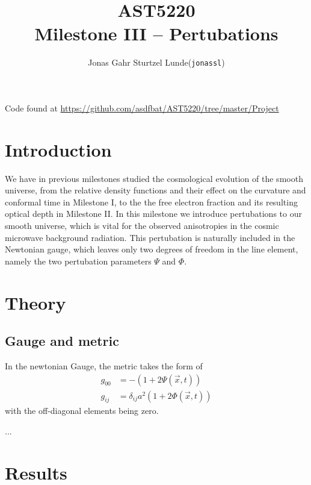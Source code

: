 \documentclass[10pt, a4paper]{article}
\begin{document}
\title{AST5220\\ Milestone III -- Pertubations}
\author{
    \begin{tabular}{r l}
        Jonas Gahr Sturtzel Lunde & (\texttt{jonassl})
    \end{tabular}}

\maketitle
Code found at \url{https://github.com/asdfbat/AST5220/tree/master/Project}
\vspace{0.7cm}

\section{Introduction}
We have in previous milestones studied the cosmological evolution of the smooth universe, from the relative density functions and their effect on the curvature and conformal time in Milestone I, to the the free electron fraction and its resulting optical depth in Milestone II. In this milestone we introduce pertubations to our smooth universe, which is vital for the observed anisotropies in the cosmic microwave background radiation. This pertubation is naturally included in the Newtonian gauge, which leaves only two degrees of freedom in the line element, namely the two pertubation parameters $\Psi$ and $\Phi$.


\section{Theory}
\subsection{Gauge and metric}
In the newtonian Gauge, the metric takes the form of
\begin{equation}
    \begin{aligned}
        g_{00} &= - (1 + 2\Psi(\vec x,t)) \\ 
        g_{ij} &= \delta_{ij}a^2(1 + 2\Phi(\vec x, t))
    \end{aligned}
\end{equation}
with the off-diagonal elements being zero.

...




\section{Results}
\end{document}
